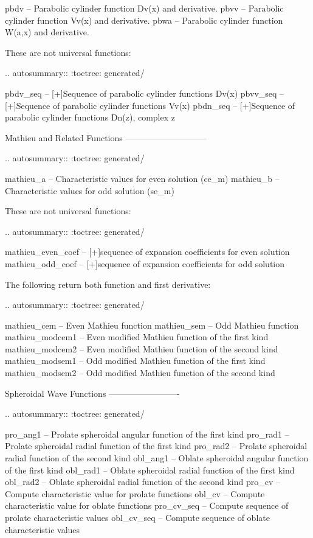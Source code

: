 \begin{DoxyVerb}
   pbdv     -- Parabolic cylinder function Dv(x) and derivative.
   pbvv     -- Parabolic cylinder function Vv(x) and derivative.
   pbwa     -- Parabolic cylinder function W(a,x) and derivative.

These are not universal functions:

.. autosummary::
   :toctree: generated/

   pbdv_seq -- [+]Sequence of parabolic cylinder functions Dv(x)
   pbvv_seq -- [+]Sequence of parabolic cylinder functions Vv(x)
   pbdn_seq -- [+]Sequence of parabolic cylinder functions Dn(z), complex z

Mathieu and Related Functions
-----------------------------

.. autosummary::
   :toctree: generated/

   mathieu_a       -- Characteristic values for even solution (ce_m)
   mathieu_b       -- Characteristic values for odd solution (se_m)

These are not universal functions:

.. autosummary::
   :toctree: generated/

   mathieu_even_coef -- [+]sequence of expansion coefficients for even solution
   mathieu_odd_coef  -- [+]sequence of expansion coefficients for odd solution

The following return both function and first derivative:

.. autosummary::
   :toctree: generated/

   mathieu_cem     -- Even Mathieu function
   mathieu_sem     -- Odd Mathieu function
   mathieu_modcem1 -- Even modified Mathieu function of the first kind
   mathieu_modcem2 -- Even modified Mathieu function of the second kind
   mathieu_modsem1 -- Odd modified Mathieu function of the first kind
   mathieu_modsem2 -- Odd modified Mathieu function of the second kind

Spheroidal Wave Functions
-------------------------

.. autosummary::
   :toctree: generated/

   pro_ang1   -- Prolate spheroidal angular function of the first kind
   pro_rad1   -- Prolate spheroidal radial function of the first kind
   pro_rad2   -- Prolate spheroidal radial function of the second kind
   obl_ang1   -- Oblate spheroidal angular function of the first kind
   obl_rad1   -- Oblate spheroidal radial function of the first kind
   obl_rad2   -- Oblate spheroidal radial function of the second kind
   pro_cv     -- Compute characteristic value for prolate functions
   obl_cv     -- Compute characteristic value for oblate functions
   pro_cv_seq -- Compute sequence of prolate characteristic values
   obl_cv_seq -- Compute sequence of oblate characteristic values


\end{DoxyVerb}
